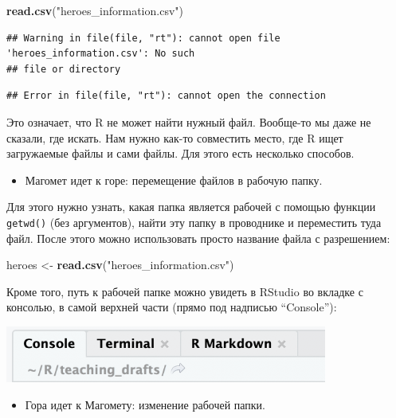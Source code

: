 \documentclass[
]{book}
\newenvironment{Shaded}{\begin{snugshade}}{\end{snugshade}}
\newcommand{\KeywordTok}[1]{\textcolor[rgb]{0.13,0.29,0.53}{\textbf{#1}}}
\newcommand{\NormalTok}[1]{#1}
\newcommand{\StringTok}[1]{\textcolor[rgb]{0.31,0.60,0.02}{#1}}
\providecommand{\tightlist}{%
  \setlength{\itemsep}{0pt}\setlength{\parskip}{0pt}}
\begin{document}
\begin{Shaded}
\begin{Highlighting}[]
\KeywordTok{read.csv}\NormalTok{(}\StringTok{"heroes_information.csv"}\NormalTok{)}
\end{Highlighting}
\end{Shaded}

\begin{verbatim}
## Warning in file(file, "rt"): cannot open file 'heroes_information.csv': No such
## file or directory
\end{verbatim}

\begin{verbatim}
## Error in file(file, "rt"): cannot open the connection
\end{verbatim}

Это означает, что R не может найти нужный файл. Вообще-то мы даже не сказали, где искать. Нам нужно как-то совместить место, где R ищет загружаемые файлы и сами файлы. Для этого есть несколько способов.

\begin{itemize}
\tightlist
\item
  Магомет идет к горе: перемещение файлов в рабочую папку.
\end{itemize}

Для этого нужно узнать, какая папка является рабочей с помощью функции \texttt{getwd()} (без аргументов), найти эту папку в проводнике и переместить туда файл. После этого можно использовать просто название файла с разрешением:

\begin{Shaded}
\begin{Highlighting}[]
\NormalTok{heroes <-}\StringTok{ }\KeywordTok{read.csv}\NormalTok{(}\StringTok{"heroes_information.csv"}\NormalTok{)}
\end{Highlighting}
\end{Shaded}

Кроме того, путь к рабочей папке можно увидеть в RStudio во вкладке с консолью, в самой верхней части (прямо под надписью ``Console''):

\includegraphics[width=4.16667in,height=\textheight]{images/Console_wd.png}

\begin{itemize}
\tightlist
\item
  Гора идет к Магомету: изменение рабочей папки.
\end{itemize}
\end{document}
